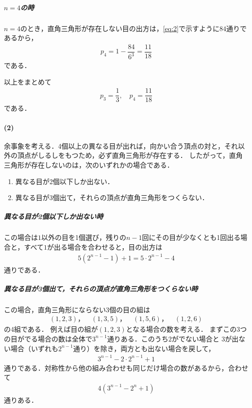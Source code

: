 \documentclass[../../main.tex]{subfiles}
\begin{document}
\subparagraph{$n=4$の時}

$n=4$のとき，直角三角形が存在しない目の出方は，\cref{eq:2}で示すように$84$通りであるから，
\begin{align}
  p_4=1-\dfrac{84}{6^3}=\dfrac{11}{18}
\end{align}
である．
\casesend

以上をまとめて
\begin{align}
  p_3 = \dfrac{1}{3}, \quad p_4 = \dfrac{11}{18}
\end{align}
である．

\paragraph{(2)}

余事象を考える．4個以上の異なる目が出れば，向かい合う頂点の対と，それ以外の頂点がしるしをもつため，必ず直角三角形が存在する．
したがって，直角三角形が存在しないのは，次のいずれかの場合である．

\begin{enumerate}
  \item 異なる目が2個以下しか出ない．
  \item 異なる目が3個出て，それらの頂点が直角三角形をつくらない．
\end{enumerate}

\subparagraph{異なる目が2個以下しか出ない時}

この場合は$1$以外の目を1個選び，残りの$n-1$回にその目が少なくとも1回出る場合と，すべて$1$が出る場合を合わせると，目の出方は
\begin{align}
  5(2^{n-1}-1)+1=5\cdot 2^{n-1}-4 \label{eq:1}
\end{align}
通りである．

\subparagraph{異なる目が3個出て，それらの頂点が直角三角形をつくらない時}

この場合，直角三角形にならない3個の目の組は
\begin{align}
  (1,2,3)，\quad (1,3,5)，\quad (1,5,6)，\quad (1,2,6)
\end{align}
の4組である．
例えば目の組が$(1,2,3)$となる場合の数を考える．
まずこの$3$つの目がでる場合の数は全体で$3^{n-1}$通りある．このうち$2$がでない場合と
$3$が出ない場合（いずれも$2^{n-1}$通り）を除き，両方とも出ない場合を戻して，
\begin{align}
  3^{n-1}-2\cdot 2^{n-1}+1
\end{align}
通りである．対称性から他の組み合わせも同じだけ場合の数があるから，合わせて
\begin{align}
  4(3^{n-1}-2^n+1) \label{eq:2}
\end{align}
通りある．
\casesend
\end{document}
